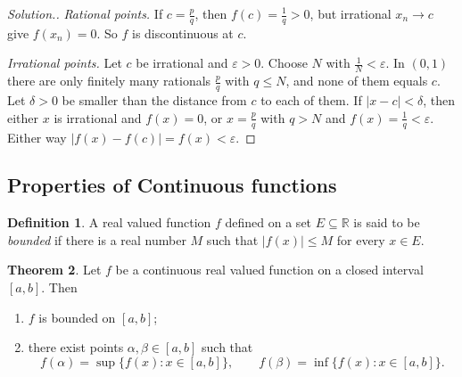 \documentclass[11pt,a4paper]{article}
\numberwithin{equation}{section}
\theoremstyle{definition}
\newtheorem{thm}{Theorem}[subsection]
\newtheorem{defn}[thm]{Definition}
\newenvironment{solution}
  {\renewcommand{\qedsymbol}{}\begin{proof}[\textit{Solution}.]}
  {\end{proof}}
\begin{document}
\begin{solution}
\emph{Rational points.} If $c = \frac{p}{q}$, then $f(c) = \frac{1}{q}>0$, but irrational $x_n\longrightarrow c$ give $f(x_n) = 0$. So $f$ is discontinuous at $c$.

\emph{Irrational points.} Let $c$ be irrational and $\varepsilon>0$. Choose $N$ with $\frac{1}{N}<\varepsilon$. In $(0,1)$ there are only finitely many rationals $\frac{p}{q}$ with $q\leq N$, and none of them equals $c$. Let $\delta>0$ be smaller than the distance from $c$ to each of them. If $|x-c|<\delta$, then either $x$ is irrational and $f(x) = 0$, or $x = \frac{p}{q}$ with $q>N$ and $f(x) = \frac{1}{q}<\varepsilon$. Either way $|f(x) - f(c)| = f(x)<\varepsilon$.
\end{solution}


\subsection{Properties of Continuous functions}

\begin{defn}
A real valued function $f$ defined on a set $E\subseteq \mathbb{R}$ is said to be \emph{bounded} if there is a real number $M$ such that $|f(x)| \leq M$ for every $x \in E$.
\end{defn}


\begin{thm}
Let $f$ be a continuous real valued function on a closed interval $[a,b]$. Then
\begin{enumerate}
\item $f$ is bounded on $[a,b]$;
\item there exist points $\alpha, \beta \in [a,b]$ such that
$$f(\alpha) = \sup \{ f(x): x\in [a,b]\}, \qquad f(\beta) = \inf \{f(x): x\in [a,b]\}.$$
\end{enumerate}
\end{thm}
\end{document}

